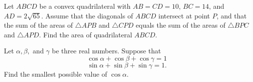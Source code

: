 \begin{question}[name={2018 AIME II, \href{https://artofproblemsolving.com/community/c4p10083420}{Problem 12}}]
	Let $ABCD$ be a convex quadrilateral with $AB=CD=10$, $BC=14$, and $AD=2\sqrt{65}$. Assume that the diagonals of $ABCD$ intersect at point $P$, and that the sum of the areas of $\triangle APB$ and $\triangle CPD$ equals the sum of the areas of $\triangle BPC$ and $\triangle APD$. Find the area of quadrilateral $ABCD$.
\end{question}


%	







\begin{question}[name={2018 HMMT, Algebra \& Number Theory, \href{https://artofproblemsolving.com/community/c129h1590229p9853117}{Problem 6}}]
	Let $\alpha,\beta,$ and $\gamma$ be three real numbers. Suppose that$$\cos\alpha+\cos\beta+\cos\gamma=1$$$$\sin\alpha+\sin\beta+\sin\gamma=1.$$Find the smallest possible value of $\cos \alpha.$
\end{question}




